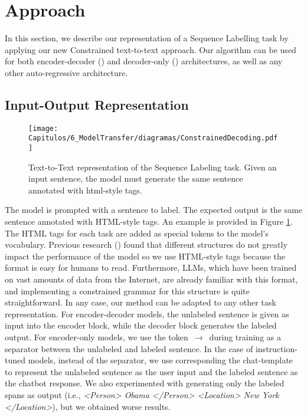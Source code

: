 \section{Approach}\label{sec6:Approach}

In this section, we describe our representation of a Sequence Labelling task by applying our new Constrained text-to-text approach. Our algorithm can be used for both encoder-decoder (\cite{DBLP:conf/nips/VaswaniSPUJGKP17}) and decoder-only (\cite{DBLP:conf/iclr/LiuSPGSKS18}) architectures, as well as any other auto-regressive architecture. 

\subsection{Input-Output Representation}
\begin{figure}[htb]
    \centering
    \texttt{[image: Capitulos/6\_ModelTransfer/diagramas/ConstrainedDecoding.pdf]}
    \caption{Text-to-Text representation of the Sequence Labeling task. Given an input sentence, the model must generate the same sentence annotated with html-style tags.}
    \label{fig6:constrained}
\end{figure}

The model is prompted with a sentence to label. The expected output is the same sentence annotated with HTML-style tags. An example is provided in Figure \ref{fig6:constrained}. The HTML tags for each task are added as special tokens to the model's vocabulary. Previous research (\cite{DBLP:conf/emnlp/0001NCHYS22}) found that different structures do not greatly impact the performance of the model so we use HTML-style tags because the format is easy for humans to read. Furthermore, LLMs, which have been trained on vast amounts of data from the Internet, are already familiar with this format, and implementing a constrained grammar for this structure is quite straightforward. In any case, our method can be adapted to any other task representation.
For encoder-decoder models, the unlabeled sentence is given as input into the encoder block, while the decoder block generates the labeled output. For encoder-only models, we use the token $\,\to\,$ during training as a separator between the unlabeled and labeled sentence. In the case of instruction-tuned models, instead of the separator, we use corresponding the chat-template to represent the unlabeled sentence as the user input and the labeled sentence as the chatbot response. We also experimented with generating only the labeled spans as output (i.e., \textit{<Person> Obama </Person> <Location> New York </Location>}), but we obtained worse results.


